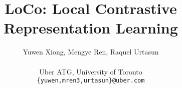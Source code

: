 \documentclass{article}
\title{LoCo: Local Contrastive Representation Learning}
\author{
  Yuwen Xiong, Mengye Ren, Raquel Urtasun\\\\
  Uber ATG, University of Toronto\\
  \texttt{\{yuwen,mren3,urtasun\}@uber.com}
}
\begin{document}
\maketitle









% 

{


}
\appendix

\end{document}
